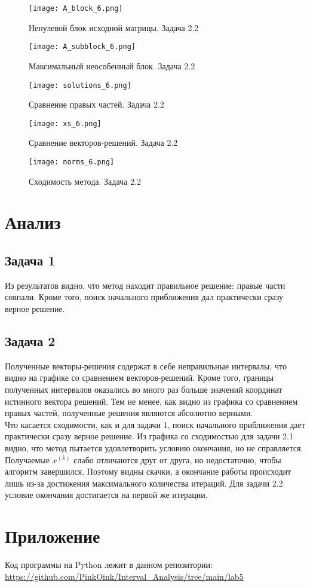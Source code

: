 \begin{figure}[h]
	\centering
	\texttt{[image: A\_block\_6.png]}
	\caption{Ненулевой блок исходной матрицы. Задача 2.2}
\end{figure}
\newpage
\begin{figure}[h]
	\centering
	\texttt{[image: A\_subblock\_6.png]}
	\caption{Максимальный неособенный блок. Задача 2.2}
\end{figure}

\begin{figure}[h]
	\centering
	\texttt{[image: solutions\_6.png]}
	\caption{Сравнение правых частей. Задача 2.2}
\end{figure}
\newpage
\begin{figure}[h]
	\centering
	\texttt{[image: xs\_6.png]}
	\caption{Сравнение векторов-решений. Задача 2.2}
\end{figure}

\begin{figure}[h]
	\centering
	\texttt{[image: norms\_6.png]}
	\caption{Сходимость метода. Задача 2.2}
\end{figure}


\section{Анализ}
\subsection{Задача 1}
Из результатов видно, что метод находит правильное решение: правые части совпали. Кроме того, поиск начального приближения дал практически сразу верное решение.

\subsection{Задача 2}
Полученные векторы-решения содержат в себе неправильные интервалы, что видно на графике со сравнением векторов-решений. Кроме того, границы полученных интервалов оказались во много раз больше значений координат истинного вектора решений. Тем не менее, как видно из графика со сравнением правых частей, полученные решения являются абсолютно верными. \\
Что касается сходимости, как и для задачи 1, поиск начального приближения дает практически сразу верное решение. Из графика со сходимостью для задачи 2.1 видно, что метод пытается удовлетворить условию окончания, но не справляется. Получаемые $x^{(k)}$ слабо отличаются друг от друга, но недостаточно, чтобы алгоритм завершился. Поэтому видны скачки, а окончание работы происходит лишь из-за достижения максимального количества итераций. Для задачи 2.2 условие окончания достигается на первой же итерации.

\section{Приложение}
Код программы на Python лежит в данном репозитории: \\
\url{https://github.com/PinkOink/Interval_Analysis/tree/main/lab5}{}


